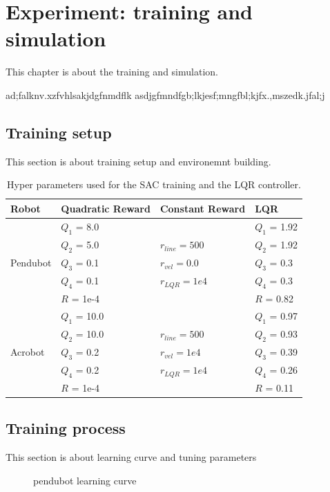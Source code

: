\chapter{Experiment: training and simulation}
This chapter is about the training and simulation.

ad;falknv.xzfvhlsakjdgfnmdflk asdjgfmndfgb;lkjesf;mngfbl;kjfx.,mszedk.jfal;j

\section{Training setup}
This section is about training setup and environemnt building.

\begin{table}[htbp]
  \centering
  \begin{tabular}{p{2cm} | p{3cm} | p{3cm} | p{3cm}}
  Robot & Quadratic Reward  & Constant Reward & LQR\\
  \hline
  \multirow{5}{*}{Pendubot} & \(Q_1\) = 8.0  &  & \(Q_1\) = 1.92\\
  & \(Q_2\) = 5.0  & \(r_{line}=500\) & \(Q_2\) = 1.92\\
  & \(Q_3\) = 0.1  & \(r_{vel}=0.0\) & \(Q_3\) = 0.3\\
  & \(Q_4\) = 0.1  & \(r_{LQR}=1e4\)& \(Q_4\) = 0.3\\
  & \(R\) = 1e-4  & & \(R\) = 0.82\\
  \hline
  \multirow{5}{*}{Acrobot} & \(Q_1\) = 10.0  &  & \(Q_1\) = 0.97\\
  & \(Q_2\) = 10.0  & \(r_{line}=500\) & \(Q_2\) = 0.93\\
  & \(Q_3\) = 0.2  & \(r_{vel}=1e4\) & \(Q_3\) = 0.39\\
  & \(Q_4\) = 0.2  & \(r_{LQR}=1e4\) & \(Q_4\) = 0.26\\
  & \(R\) = 1e-4  &  & \(R\) = 0.11\\
  \end{tabular}
 \caption{Hyper parameters used for the SAC training and the LQR controller.}
 \label{tab:parameters}
\end{table}

\section{Training process}
This section is about learning curve and tuning parameters

\begin{figure}[htbp]
    \centering
    \caption{pendubot learning curve}
    \label{fig:image_a}
\end{figure}


